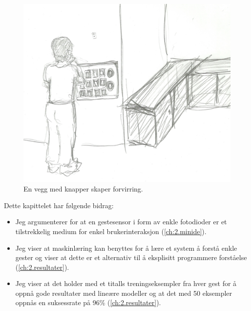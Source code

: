 \begin{figure}
\centering
\includegraphics[scale=0.1]{fig/buttons}
\caption{En vegg med knapper skaper forvirring.}
\label{fig:panel}
\end{figure}

Dette kapittelet har følgende bidrag:
\begin{itemize}
\item Jeg argumenterer for at en gestesensor i form av enkle fotodioder er et tilstrekkelig medium for enkel brukerinteraksjon (\ref{ch:2.minide}).
\item Jeg viser at maskinlæring kan benyttes for å lære et system å forstå enkle gester og viser at dette er et alternativ til å eksplisitt programmere forståelse (\ref{ch:2.resultater}).
\item Jeg viser at det holder med et titalls treningseksempler fra hver gest for å oppnå gode resultater med lineære modeller og at det med 50 eksempler oppnås en suksessrate på 96\% (\ref{ch:2.resultater}).
\end{itemize}

